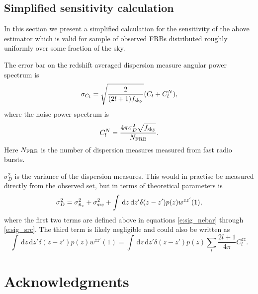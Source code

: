 \documentclass[onecolumn,prd,noshowpacs,nofootinbib,amsmath,amssymb]{revtex4}
\newcommand{\ud}{\,\mathrm{d}}
\newcommand{\red}{\textcolor{red}}
\begin{document}
\begin{comment}

\subsection{Sensitivity}

In this section we calculate the sensitivity of a hypothetical survey observing
X FRBs. Because $C_\ell$ contains the all the information we use bins
of $C_\ell$ as our parameters. We use the error bar on these parameters given
in Equation~\ref{e:error}.  We note that it is highly unlikely that an observed
set $\{D_i\}$ is even remotely Gaussian, and as such our error-bars are likely
underestimated and out estimator sub-optimal at the order unity level. 
However since given that the statistics of FRBs are currently essentially
unconstrained, we continue with this assumption.


\end{comment}

\subsection{Simplified sensitivity calculation}

In this section we present a simplified calculation for the sensitivity of the
above estimator which is valid for sample of observed
FRBs distributed roughly uniformly over some fraction of the sky.

The error bar on the redshift averaged dispersion measure angular power spectrum
is
\begin{equation}
    \sigma_{C_l} = \sqrt{\frac{2}{(2 l + 1) f_{\rm sky}}} (C_l + C^N_l),
\end{equation}
where the noise power spectrum is
\begin{equation}
    C^N_l = \frac{4 \pi \sigma_D^2 \sqrt{f_{\rm sky}}}{N_{\rm FRB}}.
\end{equation}
Here $N_{\rm FRB}$ is the number of dispersion measures measured from fast
radio bursts.

$\sigma_D^2$ is the variance of the dispersion measures.  This would in
practise be measured directly from the observed set, but in terms of
theoretical parameters is
\begin{equation}
\sigma_D^2 = \sigma_{\bar{n}_e}^2 + \sigma^2_{\rm src} + \int \ud z \ud z'
\delta(z - z') p(z) w^{z z'}(1),
\end{equation}
where the first two terms are defined above in equations \ref{e:sig_nebar}
through
\ref{e:sig_src}. The third term is likely
negligible and could also be written as
\begin{equation}
    \int \ud z \ud z' \delta(z - z') p(z) w^{z z'}(1) = \int \ud z \ud z'
    \delta(z - z') p(z) \sum_{l} \frac{2l+1}{4\pi} C_l^{zz}.
\end{equation}



\bigskip
\section*{Acknowledgments}
\medskip

 


\end{document}
